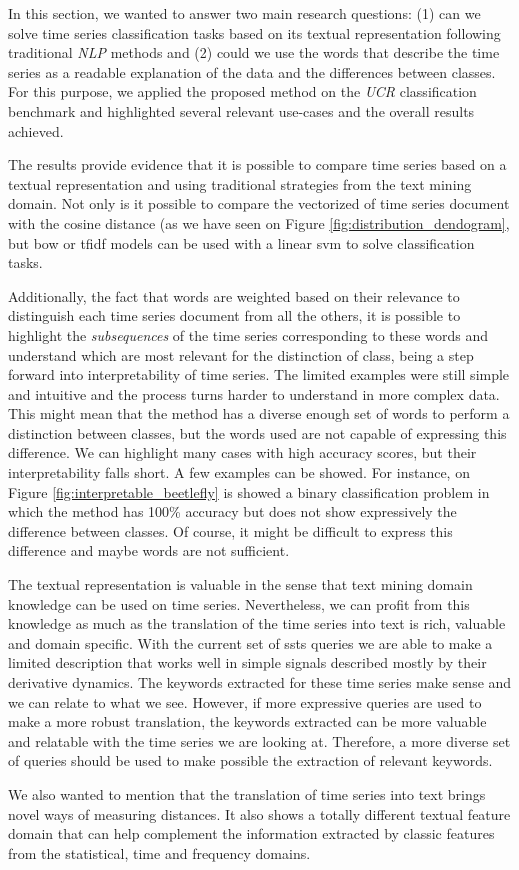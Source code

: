 In this section, we wanted to answer two main research questions: (1) can we solve time series classification tasks based on its textual representation following traditional \textit{NLP} methods and (2) could we use the words that describe the time series as a readable explanation of the data and the differences between classes. For this purpose, we applied the proposed method on the \textit{UCR} classification benchmark and highlighted several relevant use-cases and the overall results achieved.
\par
The results provide evidence that it is possible to compare time series based on a textual representation and using traditional strategies from the text mining domain. Not only is it possible to compare the vectorized of time series document with the cosine distance (as we have seen on Figure \ref{fig:distribution_dendogram}, but \gls{bow} or \gls{tfidf} models can be used with a linear \gls{svm} to solve classification tasks.
\par
Additionally, the fact that words are weighted based on their relevance to distinguish each time series document from all the others, it is possible to highlight the \textit{subsequences} of the time series corresponding to these words and understand which are most relevant for the distinction of class, being a step forward into interpretability of time series. The limited examples were still simple and intuitive and the process turns harder to understand in more complex data. This might mean that the method has a diverse enough set of words to perform a distinction between classes, but the words used are not capable of expressing this difference. We can highlight many cases with high accuracy scores, but their interpretability falls short. A few examples can be showed. For instance, on Figure \ref{fig:interpretable_beetlefly} is showed a binary classification problem in which the method has 100\% accuracy but does not show expressively the difference between classes. Of course, it might be difficult to express this difference and maybe words are not sufficient. 
\par
The textual representation is valuable in the sense that text mining domain knowledge can be used on time series. Nevertheless, we can profit from this knowledge as much as the translation of the time series into text is rich, valuable and domain specific. With the current set of \gls{ssts} queries we are able to make a limited description that works well in simple signals described mostly by their derivative dynamics. The keywords extracted for these time series make sense and we can relate to what we see. However, if more expressive queries are used to make a more robust translation, the keywords extracted can be more valuable and relatable with the time series we are looking at. Therefore, a more diverse set of queries should be used to make possible the extraction of relevant keywords.
\par
We also wanted to mention that the translation of time series into text brings novel ways of measuring distances. It also shows a totally different textual feature domain that can help complement the information extracted by classic features from the statistical, time and frequency domains. 

